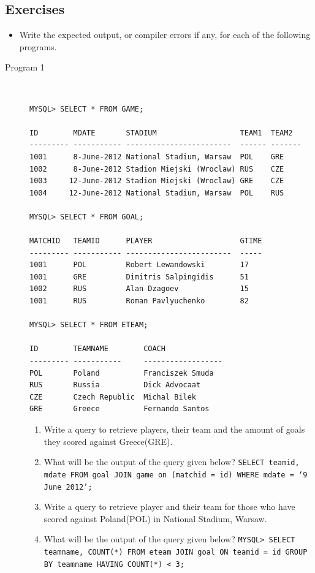 \documentclass[11pt,a4paper]{article}
\def\AnswerBox{\fbox{\begin{minipage}{4in}\hfill\vspace{0.5in}\end{minipage}}}
\begin{document}
\subsection*{Exercises}
\begin{itemize}
\item Write the expected output, or compiler errors if any, for each of the following programs.

\end{itemize}
\begin{description}
\item[Program 1]\
\begin{verbatim}
MYSQL> SELECT * FROM GAME;

ID        MDATE       STADIUM                   TEAM1  TEAM2
--------- ----------- ------------------------  ------ -------
1001      8-June-2012 National Stadium, Warsaw  POL    GRE
1002      8-June-2012 Stadion Miejski (Wroclaw) RUS    CZE
1003     12-June-2012 Stadion Miejski (Wroclaw) GRE    CZE
1004     12-June-2012 National Stadium, Warsaw	POL    RUS

MYSQL> SELECT * FROM GOAL;

MATCHID   TEAMID      PLAYER                    GTIME
--------- ----------- ------------------------  -----
1001      POL         Robert Lewandowski        17
1001      GRE         Dimitris Salpingidis      51
1002      RUS         Alan Dzagoev              15
1001      RUS         Roman Pavlyuchenko        82

MYSQL> SELECT * FROM ETEAM;

ID        TEAMNAME        COACH                   
--------- -----------     ------------------
POL       Poland          Franciszek Smuda
RUS       Russia          Dick Advocaat
CZE       Czech Republic  Michal Bilek
GRE       Greece          Fernando Santos      
\end{verbatim}



\begin{enumerate}[label=\bfseries Q\arabic*:]\itemsep10pt
\item Write a query to retrieve players, their team and the amount of goals they scored against Greece(GRE).
\item What will be the output of the query given below?\newline
\texttt{SELECT teamid, mdate FROM goal JOIN game on (matchid = id) WHERE mdate = `9 June 2012';}
\item Write a query to retrieve player and their team for those who have scored against Poland(POL) in National Stadium, Warsaw.
\item What will be the output of the query given below?\newline
\texttt{MYSQL> SELECT teamname, COUNT(*) FROM eteam JOIN goal ON teamid = id GROUP BY teamname HAVING COUNT(*) < 3;}


\end{enumerate}
\end{description}
\end{document}
